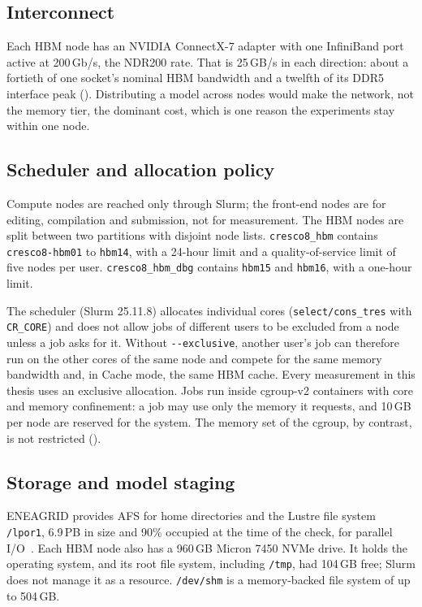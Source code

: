 \subsection{Interconnect}

Each HBM node has an NVIDIA ConnectX-7 adapter with one InfiniBand port
active at 200\,Gb/s, the NDR200 rate.  That is 25\,GB/s in each
direction: about a fortieth of one socket's nominal HBM bandwidth and a
twelfth of its DDR5 interface peak ().
Distributing a model
across nodes would make the network, not the memory tier, the dominant
cost, which is one reason the experiments stay within one node.

\subsection{Scheduler and allocation policy}
\label{sec:cresco8-scheduler}

Compute nodes are reached only through Slurm; the front-end nodes are
for editing, compilation and submission, not for measurement.  The HBM
nodes are split between two partitions with disjoint node lists.
\texttt{cresco8\_hbm} contains \texttt{cresco8-hbm01} to \texttt{hbm14},
with a 24-hour limit and a quality-of-service limit of five nodes per
user.  \texttt{cresco8\_hbm\_dbg} contains \texttt{hbm15} and
\texttt{hbm16}, with a one-hour limit.

The scheduler (Slurm 25.11.8) allocates individual cores
(\texttt{select/cons\_tres} with \texttt{CR\_CORE}) and does not allow jobs
of different users to be excluded from a node unless a job asks for it.
Without \texttt{-{}-exclusive}, another user's job can therefore run on the
other cores of the same node and compete for the same memory bandwidth
and, in Cache mode, the same HBM cache.  Every measurement in this thesis
uses an exclusive allocation.  Jobs run inside cgroup-v2 containers with
core and memory confinement: a job may use only the memory it requests,
and 10\,GB per node are reserved for the system.  The memory set of the
cgroup, by contrast, is not restricted ().

\subsection{Storage and model staging}
\label{sec:cresco8-storage}

ENEAGRID provides AFS for home directories and the Lustre file system
\texttt{/lpor1}, 6.9\,PB in size and 90\% occupied at the time of the
check, for parallel I/O~\cite{cresco8doc}.  Each HBM node also has a
960\,GB Micron 7450 NVMe drive.  It holds the operating system, and its
root file system, including \texttt{/tmp}, had 104\,GB free; Slurm does
not manage it as a resource.  \texttt{/dev/shm} is a memory-backed file
system of up to 504\,GB.


